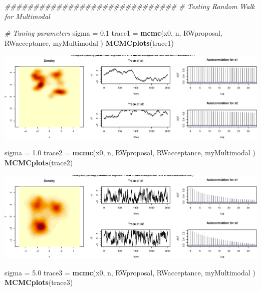 \documentclass[
]{article}
\newenvironment{Shaded}{\begin{snugshade}}{\end{snugshade}}
\newcommand{\CommentTok}[1]{\textcolor[rgb]{0.56,0.35,0.01}{\textit{#1}}}
\newcommand{\FloatTok}[1]{\textcolor[rgb]{0.00,0.00,0.81}{#1}}
\newcommand{\KeywordTok}[1]{\textcolor[rgb]{0.13,0.29,0.53}{\textbf{#1}}}
\newcommand{\NormalTok}[1]{#1}
\newcommand{\StringTok}[1]{\textcolor[rgb]{0.31,0.60,0.02}{#1}}
\begin{document}
\begin{Shaded}
\begin{Highlighting}[]
\CommentTok{##############################}
\CommentTok{# Testing Random Walk for Multimodal}

\CommentTok{# Tuning parameters}
\NormalTok{sigma =}\StringTok{ }\FloatTok{0.1}
\NormalTok{trace1 =}\StringTok{ }\KeywordTok{mcmc}\NormalTok{(x0, n, RWproposal, RWacceptance, myMultimodal )}
\KeywordTok{MCMCplots}\NormalTok{(trace1)}
\end{Highlighting}
\end{Shaded}

\includegraphics{Project1_files/figure-latex/RandomWalk2-1.pdf}

\begin{Shaded}
\begin{Highlighting}[]
\NormalTok{sigma =}\StringTok{ }\FloatTok{1.0}
\NormalTok{trace2 =}\StringTok{ }\KeywordTok{mcmc}\NormalTok{(x0, n, RWproposal, RWacceptance, myMultimodal )}
\KeywordTok{MCMCplots}\NormalTok{(trace2)}
\end{Highlighting}
\end{Shaded}

\includegraphics{Project1_files/figure-latex/RandomWalk2-2.pdf}

\begin{Shaded}
\begin{Highlighting}[]
\NormalTok{sigma =}\StringTok{ }\FloatTok{5.0}
\NormalTok{trace3 =}\StringTok{ }\KeywordTok{mcmc}\NormalTok{(x0, n, RWproposal, RWacceptance, myMultimodal )}
\KeywordTok{MCMCplots}\NormalTok{(trace3)}
\end{Highlighting}
\end{Shaded}
\end{document}

